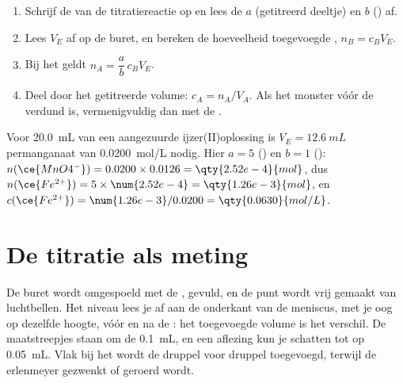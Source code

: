 \begin{method}\label{met:g11:titration:computing}
\begin{enumerate}
  \item Schrijf de  van de titratiereactie
        op en lees de  $a$ (getitreerd deeltje) en $b$
        () af.
  \item Lees $V_E$ af op de buret, en bereken de hoeveelheid toegevoegde
        , $n_B = c_B V_E$.
  \item Bij het  geldt $n_A = \dfrac{a}{b}\, c_B V_E$.
  \item Deel door het getitreerde volume: $c_A = n_A / V_A$. Als het
        monster vóór de  verdund is, vermenigvuldig dan met de
        .
\end{enumerate}
\end{method}

\begin{example}\label{ex:g11:titration:iron}
Voor \qty{20.0}{mL} van een aangezuurde ijzer(II)oplossing is
$V_E = \qty{12.6}{mL}$ permanganaat van \qty{0.0200}{mol/L} nodig. Hier
$a = 5$ () en $b = 1$ ():
$n(\ce{MnO4^-}) = 0.0200 \times 0.0126 = \qty{2.52e-4}{mol}$, dus
$n(\ce{Fe^{2+}}) = 5 \times \num{2.52e-4} = \qty{1.26e-3}{mol}$, en
$c(\ce{Fe^{2+}}) = \num{1.26e-3} / 0.0200 = \qty{0.0630}{mol/L}$.
\end{example}

\section{De titratie als meting}

\begin{inthelab}
De buret wordt omgespoeld met de , gevuld, en de punt wordt vrij
gemaakt van luchtbellen. Het niveau lees je af aan de onderkant van de
meniscus, met je oog op dezelfde hoogte, vóór en na de : het
toegevoegde volume is het verschil. De maatstreepjes staan om de
\qty{0.1}{mL}, en een aflezing kun je schatten tot op \qty{0.05}{mL}.
Vlak bij het  wordt de  druppel voor druppel
toegevoegd, terwijl de erlenmeyer gezwenkt of geroerd wordt.
\end{inthelab}

